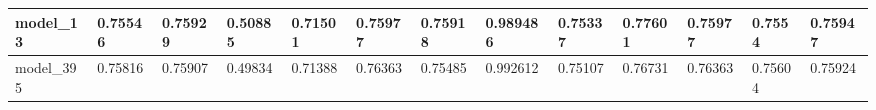 \begin{tabular}{|l|l|l|l|l|l|l|l|l|l|l|l|l|}
model\_13      & 0.75546     & 0.75929        & 0.50885      & 0.71501          & 0.75977              & 0.75918              & 0.989486     & 0.75337           & 0.77601            & 0.75977         & 0.7554      & 0.75947      \\ \hline
model\_395     & 0.75816     & 0.75907        & 0.49834      & 0.71388          & 0.76363              & 0.75485              & 0.992612     & 0.75107           & 0.76731            & 0.76363         & 0.75604     & 0.75924      \\ \hline
\end{tabular}